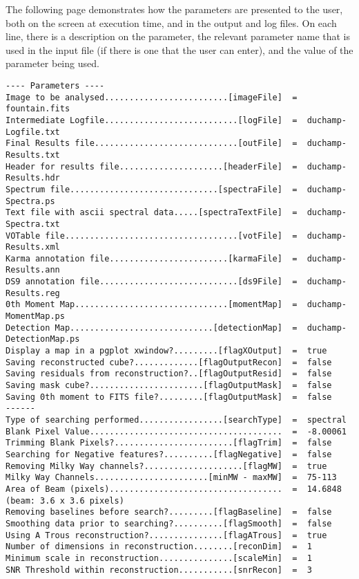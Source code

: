 The following page demonstrates how the parameters are presented to
the user, both on the screen at execution time, and in the output and
log files. On each line, there is a description on the parameter, the
relevant parameter name that is used in the input file (if there is
one that the user can enter), and the value of the parameter being
used.

\newpage
{\scriptsize
\begin{verbatim}
---- Parameters ----
Image to be analysed.........................[imageFile]  =  fountain.fits
Intermediate Logfile...........................[logFile]  =  duchamp-Logfile.txt
Final Results file.............................[outFile]  =  duchamp-Results.txt
Header for results file.....................[headerFile]  =  duchamp-Results.hdr
Spectrum file..............................[spectraFile]  =  duchamp-Spectra.ps
Text file with ascii spectral data.....[spectraTextFile]  =  duchamp-Spectra.txt
VOTable file...................................[votFile]  =  duchamp-Results.xml
Karma annotation file........................[karmaFile]  =  duchamp-Results.ann
DS9 annotation file............................[ds9File]  =  duchamp-Results.reg
0th Moment Map...............................[momentMap]  =  duchamp-MomentMap.ps
Detection Map.............................[detectionMap]  =  duchamp-DetectionMap.ps
Display a map in a pgplot xwindow?.........[flagXOutput]  =  true
Saving reconstructed cube?.............[flagOutputRecon]  =  false
Saving residuals from reconstruction?..[flagOutputResid]  =  false
Saving mask cube?.......................[flagOutputMask]  =  false
Saving 0th moment to FITS file?.........[flagOutputMask]  =  false
------
Type of searching performed.................[searchType]  =  spectral
Blank Pixel Value.......................................  =  -8.00061
Trimming Blank Pixels?........................[flagTrim]  =  false
Searching for Negative features?..........[flagNegative]  =  false
Removing Milky Way channels?....................[flagMW]  =  true
Milky Way Channels.......................[minMW - maxMW]  =  75-113
Area of Beam (pixels)...................................  =  14.6848   (beam: 3.6 x 3.6 pixels)
Removing baselines before search?.........[flagBaseline]  =  false
Smoothing data prior to searching?..........[flagSmooth]  =  false
Using A Trous reconstruction?...............[flagATrous]  =  true
Number of dimensions in reconstruction........[reconDim]  =  1
Minimum scale in reconstruction...............[scaleMin]  =  1
SNR Threshold within reconstruction...........[snrRecon]  =  3

\end{verbatim}}
